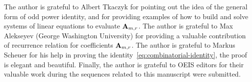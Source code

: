 The author is grateful to Albert Tkaczyk for pointing out the idea of the general form of odd power identity,
and for providing examples of how to build and solve systems of linear equations to evaluate ${\mathbf{A}} \sb{m,r}$.
The author is grateful to Max Alekseyev (George Washington University) for providing a valuable contribution
of recurrence relation for coefficients ${\mathbf{A}} \sb{m,r}$.
The author is grateful to Markus Scheuer for his help in proving the identity~\eqref{eq:combinatorial-identity},
the proof is elegant and beautiful.
Finally, the author is grateful to OEIS editors for their valuable work during the sequences
related to this manuscript were submitted.
